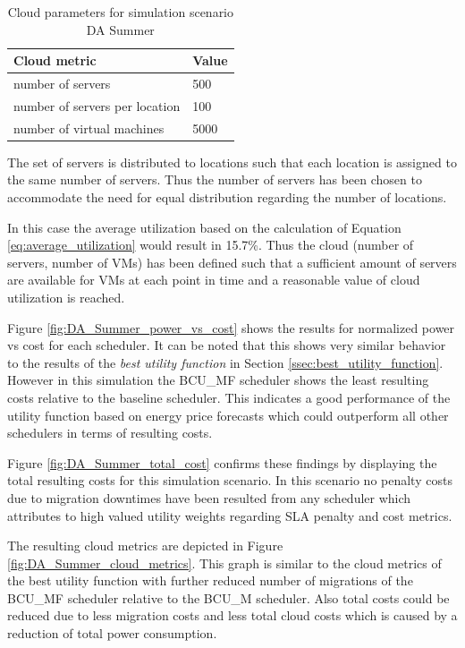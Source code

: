 \begin{table}[htbp]
\centering
\begin{tabular}[\textwidth]{ll}
\toprule
	Cloud metric & Value  \\
\midrule
	number of servers & 500 \\
	number of servers per location & 100 \\
	number of virtual machines & 5000\\
\bottomrule
\end{tabular}
\caption{Cloud parameters for simulation scenario DA Summer}
\label{tab:da_summer_cloud_parameters}
\end{table}

The set of servers is distributed to locations such that each location is assigned to the same number of servers. Thus the number of servers has been chosen to accommodate the need for equal distribution regarding the number of locations. 


In this case the average utilization based on the calculation of Equation \ref{eq:average_utilization} would result in 15.7\%. 
Thus the cloud (number of servers, number of VMs) has been defined such that a sufficient amount of servers are available for VMs at each point in time and a reasonable value of cloud utilization is reached. 


Figure \ref{fig:DA_Summer_power_vs_cost} shows the results for normalized power vs cost for each scheduler. 
It can be noted that this shows very similar behavior to the results of the \textit{best utility function} in Section \ref{ssec:best_utility_function}. However in this simulation the BCU\_MF scheduler shows the least resulting costs relative to the baseline scheduler. This indicates a good performance of the utility function based on energy price forecasts which could outperform all other schedulers in terms of resulting costs. 

Figure \ref{fig:DA_Summer_total_cost} confirms these findings by displaying the total resulting costs for this simulation scenario. 
In this scenario no penalty costs due to migration downtimes have been resulted from any scheduler which attributes to high valued utility weights regarding SLA penalty and cost metrics. 

The resulting cloud metrics are depicted in Figure \ref{fig:DA_Summer_cloud_metrics}. This graph is similar to the cloud metrics of the best utility function with further reduced number of migrations of the BCU\_MF scheduler relative to the BCU\_M scheduler. Also total costs could be reduced due to less migration costs and less total cloud costs which is caused by a reduction of total power consumption. 

